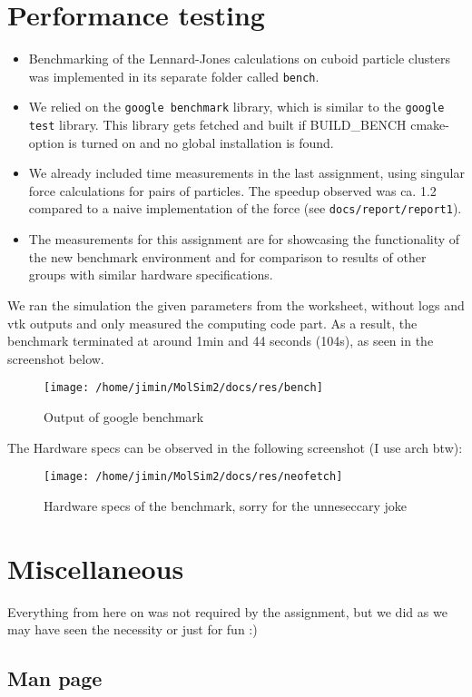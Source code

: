 \documentclass{article}
\begin{document}
\section{Performance testing}
\label{sec:perf}
\begin{itemize}
    \item Benchmarking of the Lennard-Jones calculations on cuboid particle clusters was implemented in its separate folder called \texttt{bench}.
    \item We relied on the \verb|google benchmark| library, which is similar to the \verb|google test| library. This library gets fetched and built if BUILD\_BENCH cmake-option is turned on and no global installation is found.
    \item We already included time measurements in the last assignment, using singular force calculations for pairs of particles. The speedup observed was ca. 1.2 compared to a naive implementation of the force (see \texttt{docs/report/report1}).
    \item The measurements for this assignment are for showcasing the functionality of the new benchmark environment and for comparison to results of other groups with similar hardware specifications.
\end{itemize}
    We ran the simulation the given parameters from the worksheet, without logs and vtk outputs and only measured the computing code part. As a result, the benchmark terminated at around 1min and 44 seconds (104s), as seen in the screenshot below. 

    \begin{figure}[H]
        \texttt{[image: /home/jimin/MolSim2/docs/res/bench]}
        \caption{Output of google benchmark}
    \end{figure}

    The Hardware specs can be observed in the following screenshot (I use arch btw):
    \begin{figure}[H]
        \texttt{[image: /home/jimin/MolSim2/docs/res/neofetch]}
        \caption{Hardware specs of the benchmark, sorry for the unneseccary joke}
    \end{figure}
   

\section{Miscellaneous}
Everything from here on was not required by the assignment, but we did as we may have seen the necessity or just for fun :)
\subsection{Man page}
\end{document}
